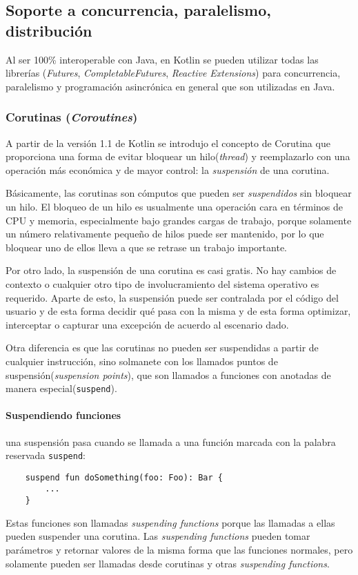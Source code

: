\subsection{Soporte a concurrencia, paralelismo, distribución}
Al ser 100\% interoperable con Java, en Kotlin se pueden utilizar todas las librerías (\emph{Futures}, \emph{CompletableFutures}, \emph{Reactive Extensions}) para concurrencia, paralelismo y programación asincrónica en general que son utilizadas en Java.

\subsubsection{Corutinas (\emph{Coroutines})}
A partir de la versión 1.1 de Kotlin se introdujo el concepto de Corutina que proporciona una forma de evitar bloquear un hilo(\emph{thread}) y reemplazarlo con una operación más económica y de mayor control: la \emph{suspensión} de una corutina.

Básicamente, las corutinas son cómputos que pueden ser \emph{suspendidos} sin bloquear un hilo. El bloqueo de un hilo es usualmente una operación cara en términos de CPU y memoria, especialmente bajo grandes cargas de trabajo, porque solamente un número relativamente pequeño de hilos puede ser mantenido, por lo que bloquear uno de ellos lleva a que se retrase un trabajo importante.

Por otro lado, la suspensión de una corutina es casi gratis. No hay cambios de contexto o cualquier otro tipo de involucramiento del sistema operativo es requerido. Aparte de esto, la suspensión puede ser contralada por el código del usuario y de esta forma decidir qué pasa con la misma y de esta forma optimizar, interceptar o capturar una excepción de acuerdo al escenario dado.

Otra diferencia es que las corutinas no pueden ser suspendidas a partir de cualquier instrucción, sino solmanete con los llamados puntos de suspensión(\emph{suspension points}), que son llamados a funciones con anotadas de manera especial(\texttt{suspend}).

\paragraph{Suspendiendo funciones} una suspensión pasa cuando se llamada a una función marcada con la palabra reservada \texttt{suspend}:
\begin{verbatim}
    suspend fun doSomething(foo: Foo): Bar {
        ...
    }
\end{verbatim}
Estas funciones son llamadas \emph{suspending functions} porque las llamadas a ellas pueden suspender una corutina. Las \emph{suspending functions} pueden tomar parámetros y retornar valores de la misma forma que las funciones normales, pero solamente pueden ser llamadas desde corutinas y otras \emph{suspending functions}.

